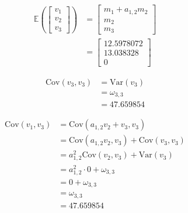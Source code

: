 \documentclass[
]{book}
\begin{document}
\begin{equation}
  \begin{split}
    \mathbb{E}
    \left(
      \begin{bmatrix}
        v_1 \\
        v_2 \\
        v_3
      \end{bmatrix}
    \right)
    &=
    \begin{bmatrix}
      m_1 + a_{1, 2} m_2 \\
      m_2 \\
      m_3
    \end{bmatrix} \\
    &=
    \begin{bmatrix}
      12.5978072 \\
      13.038328 \\
      0
    \end{bmatrix}
  \end{split}
\end{equation}

\begin{equation}
  \begin{split}
    \mathrm{Cov}
    \left(
      v_3,
      v_3
    \right)
    &=
    \mathrm{Var}
    \left(
      v_3
    \right) \\
    &=
    \omega_{3, 3} \\
    &=
    47.659854
  \end{split}
\end{equation}

\begin{equation}
  \begin{split}
    \mathrm{Cov}
    \left(
      v_1,
      v_3
    \right)
    &=
    \mathrm{Cov}
    \left(
      a_{1, 2} v_2 + v_3,
      v_3 
    \right) \\
    &=
    \mathrm{Cov}
    \left(
      a_{1, 2} v_2, v_3
    \right)
    +
    \mathrm{Cov}
    \left(
      v_3, v_3
    \right) \\
    &=
    a_{1, 2}^{2}
    \mathrm{Cov}
    \left(
      v_2, v_3
    \right)
    +
    \mathrm{Var}
    \left(
      v_3
    \right) \\
    &=
    a_{1, 2}^{2}
    \cdot
    0
    +
    \omega_{3, 3} \\
    &=
    0
    +
    \omega_{3, 3} \\
    &=
    \omega_{3, 3} \\
    &=
    47.659854
  \end{split}
\end{equation}
\end{document}
